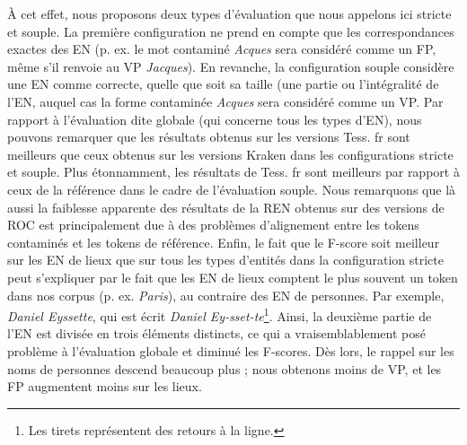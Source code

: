 À cet effet, nous proposons deux types d'évaluation que nous appelons ici \og{}stricte\fg{} et \og{}souple\fg{}. La première configuration ne prend en compte que les correspondances exactes des EN (p. ex. le mot contaminé \textit{Acques} sera considéré comme un FP, même s'il renvoie au VP \textit{Jacques}). En revanche, la configuration \og{}souple\fg{} considère une EN comme correcte, quelle que soit sa taille (une partie ou l'intégralité de l'EN, auquel cas la forme contaminée \textit{Acques} sera considéré comme un VP. Par rapport à l'évaluation dite \og{}globale\fg{} (qui concerne tous les types d'EN), nous pouvons remarquer que les résultats obtenus sur les versions Tess. fr sont meilleurs que ceux obtenus sur les versions Kraken dans les configurations stricte et souple.
  Plus étonnamment, les résultats de Tess. fr sont meilleurs par rapport à ceux de la référence dans le cadre de l'évaluation souple.
 Nous remarquons que là aussi la faiblesse apparente des résultats de la REN obtenus sur des versions de ROC est principalement due à des problèmes d'alignement entre les tokens contaminés et les tokens de référence. 
  Enfin, le fait que le F-score soit meilleur sur les EN de lieux que sur tous les types d'entités dans la configuration stricte peut s'expliquer par le fait que les EN de lieux comptent le plus souvent un token dans nos corpus (p. ex. \textit{Paris}), au contraire des EN de personnes. Par exemple, \textit{Daniel Eyssette}, qui est écrit \textit{Daniel Ey-sset-te}\footnote{Les tirets représentent des retours à la ligne.}. Ainsi, la deuxième partie de l'EN est divisée en trois éléments distincts, ce qui a vraisemblablement posé problème à l'évaluation globale et diminué les F-scores. Dès lors, le rappel sur les noms de personnes descend beaucoup plus ; nous obtenons moins de VP, et les FP augmentent moins sur les lieux.


